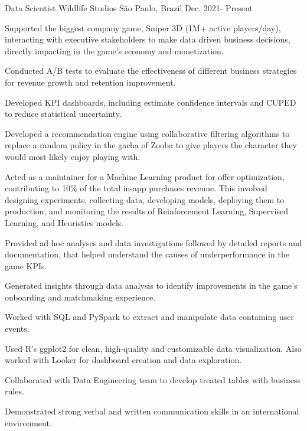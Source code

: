 \begin{cventries}

    \cventry
    {Data Scientist}
    {Wildlife Studios}
    {São Paulo, Brazil}
    {Dec. 2021- Present}
    {
      \begin{cvitems}
        \item {Supported the biggest company game, Sniper 3D (1M+ active players/day), interacting with executive stakeholders to make data driven business decisions, directly impacting in the game's economy and monetization. }
        \item {Conducted A/B tests to evaluate the effectiveness of different business strategies for revenue growth and retention improvement. }
        \item {Developed KPI dashboards, including estimate confidence intervals and CUPED to reduce statistical uncertainty. }
        \item {Developed a recommendation engine using collaborative filtering algorithms to replace a random policy in the gacha of Zooba to give players the character they would most likely enjoy playing with. }
        \item {Acted as a maintainer for a Machine Learning product for offer optimization, contributing to 10\% of the total in-app purchases revenue. This involved designing experiments, collecting data, developing models, deploying them to production, and monitoring the results of Reinforcement Learning, Supervised Learning, and Heuristics models. }
        \item {Provided ad hoc analyses and data investigations followed by detailed reports and documentation, that helped understand the causes of underperformance in the game KPIs. }
        \item {Generated insights through data analysis to identify improvements in the game's onboarding and matchmaking experience. }
        \item {Worked with SQL and PySpark to extract and manipulate data containing user events. }
        \item {Used R's ggplot2 for clean, high-quality and customizable data visualization. Also worked with Looker for dashboard creation and data exploration. }
        \item {Collaborated with Data Engineering team to develop treated tables with business rules. }
        \item {Demonstrated  strong verbal and written communication skills in an international environment. }
      \end{cvitems}
    }


\end{cventries}
